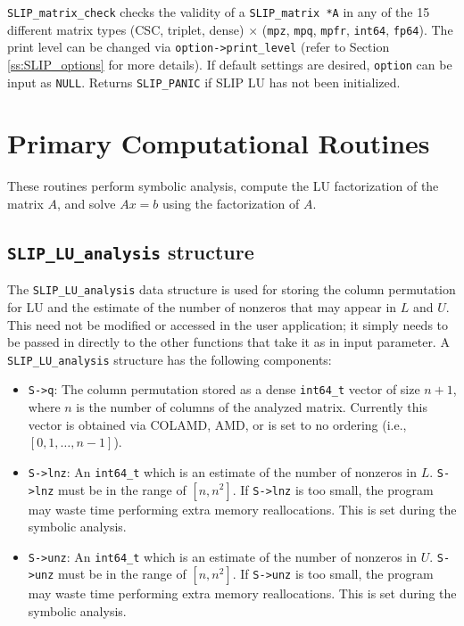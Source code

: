 \documentclass[12pt]{article}
\theoremstyle{definition}
\begin{document}
\verb|SLIP_matrix_check| checks the validity of a \verb|SLIP_matrix *A| in any
of the 15 different matrix types (CSC, triplet, dense) $\times$ (\verb|mpz|,
\verb|mpq|, \verb|mpfr|, \verb|int64|, \verb|fp64|). The print level can be
changed via \verb|option->print_level| (refer to Section \ref{ss:SLIP_options}
for more details).  If default settings are desired, \verb|option| can be input
as \verb|NULL|.  Returns \verb|SLIP_PANIC| if SLIP LU has not been initialized.

\section{Primary Computational Routines}
\label{s:primary}

These routines perform symbolic analysis, compute the LU factorization of the
matrix $A$, and solve $Ax=b$ using the factorization of $A$.

\cprotect\subsection{\verb|SLIP_LU_analysis| structure}
\label{ss:SLIP_LU_analysis}

The \verb|SLIP_LU_analysis| data structure is used for storing the column
permutation for LU and the estimate of the number of nonzeros that may appear
in $L$ and $U$.  This need not be modified or accessed in the user application;
it simply needs to be passed in directly to the other functions that take it as
in input parameter. A \verb|SLIP_LU_analysis| structure has the following
components:

\begin{itemize}
\item \verb|S->q|: The column permutation stored as a dense \verb|int64_t|
vector of size $n+1$, where $n$ is the number of columns of the analyzed matrix.
Currently this vector is obtained via COLAMD, AMD, or is set to no ordering
(i.e., $[0, 1, \hdots, n-1]$).

\item \verb|S->lnz|: An \verb|int64_t| which is an estimate of the number of
nonzeros in $L$. \verb|S->lnz| must be in the range of $[n, n^2]$. If
\verb|S->lnz| is too small, the program may waste time performing extra memory
reallocations. This is set during the symbolic analysis.

\item \verb|S->unz|: An \verb|int64_t| which is an estimate of the number of
nonzeros in $U$. \verb|S->unz| must be in the range of $[n, n^2]$. If
\verb|S->unz| is too small, the program may waste time performing extra memory
reallocations. This is set during the symbolic analysis.
\end{itemize}
\end{document}
